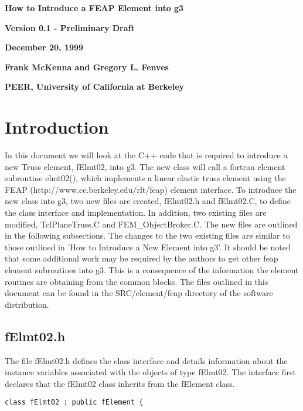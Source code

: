 \documentclass[12pt]{article}
\begin{document}



\begin{center}
{\bf \Large How to Introduce a FEAP Element into g3}

{\bf Version 0.1 - Preliminary Draft} 

{\bf  December 20, 1999} 

{\bf  Frank McKenna and Gregory L. Fenves} 

{\bf  PEER, University of California at Berkeley}

\end{center}

\vspace{.2in}
\section{Introduction}
In this document we will look at the C++ code that is required to
introduce a new Truss element, fElmt02, into g3. The new class will
call a fortran element subroutine elmt02(), which implements a linear
elastic truss element using the FEAP
(http://www.ce.berkeley.edu/rlt/feap) element interface. To introduce
the new class into g3, two new files are created, {\sf fElmt02.h} and
{\sf fElmt02.C}, to define the class interface and implementation. In
addition, two existing files are modified, {\sf TclPlaneTruss.C} and
{\sf FEM\_ObjectBroker.C}.  The new files are outlined in the following
subsections. The changes to the two existing files are similar to
those outlined in 'How to Introduce a New Element into g3'.
It should be noted that some additional work may be required by the
authors to get other feap element subroutines into g3. This is a
consequence of the information the element routines are obtaining from
the common blocks. The files outlined in this document can be found in the
SRC/element/feap  directory of the software distribution.



\subsection {\sf fElmt02.h}
The file {\sf fElmt02.h} defines the class interface and details
information about the instance variables associated with the objects
of type fElmt02. The interface first declares that the fElmt02 class
inherits from the fElement class. 

{\sf\small \begin{verbatim}
class fElmt02 : public fElement {
\end{verbatim} }
\end{document}
